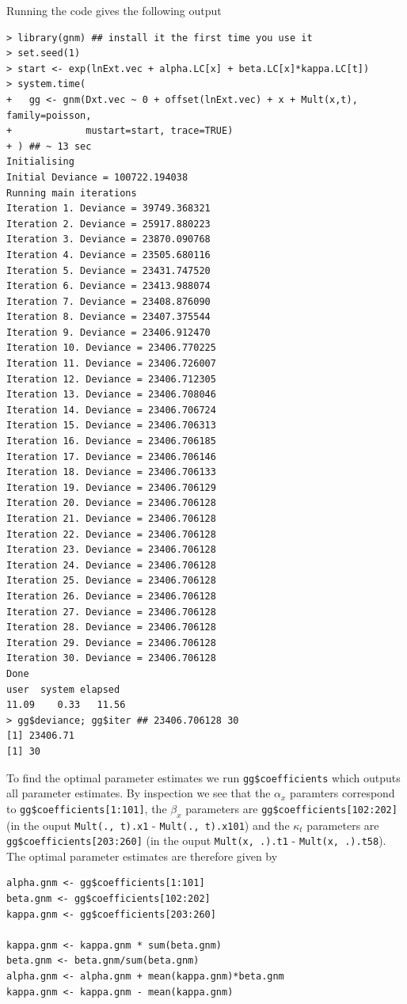 \documentclass[11pt]{article}
\begin{document}
Running the code gives the following output
\begin{verbatim}
> library(gnm) ## install it the first time you use it
> set.seed(1)
> start <- exp(lnExt.vec + alpha.LC[x] + beta.LC[x]*kappa.LC[t])
> system.time(
+   gg <- gnm(Dxt.vec ~ 0 + offset(lnExt.vec) + x + Mult(x,t), family=poisson,
+             mustart=start, trace=TRUE)
+ ) ## ~ 13 sec
Initialising
Initial Deviance = 100722.194038
Running main iterations
Iteration 1. Deviance = 39749.368321
Iteration 2. Deviance = 25917.880223
Iteration 3. Deviance = 23870.090768
Iteration 4. Deviance = 23505.680116
Iteration 5. Deviance = 23431.747520
Iteration 6. Deviance = 23413.988074
Iteration 7. Deviance = 23408.876090
Iteration 8. Deviance = 23407.375544
Iteration 9. Deviance = 23406.912470
Iteration 10. Deviance = 23406.770225
Iteration 11. Deviance = 23406.726007
Iteration 12. Deviance = 23406.712305
Iteration 13. Deviance = 23406.708046
Iteration 14. Deviance = 23406.706724
Iteration 15. Deviance = 23406.706313
Iteration 16. Deviance = 23406.706185
Iteration 17. Deviance = 23406.706146
Iteration 18. Deviance = 23406.706133
Iteration 19. Deviance = 23406.706129
Iteration 20. Deviance = 23406.706128
Iteration 21. Deviance = 23406.706128
Iteration 22. Deviance = 23406.706128
Iteration 23. Deviance = 23406.706128
Iteration 24. Deviance = 23406.706128
Iteration 25. Deviance = 23406.706128
Iteration 26. Deviance = 23406.706128
Iteration 27. Deviance = 23406.706128
Iteration 28. Deviance = 23406.706128
Iteration 29. Deviance = 23406.706128
Iteration 30. Deviance = 23406.706128
Done
user  system elapsed 
11.09    0.33   11.56 
> gg$deviance; gg$iter ## 23406.706128 30
[1] 23406.71
[1] 30
\end{verbatim}

To find the optimal parameter estimates we run \verb|gg$coefficients| which outputs all parameter estimates. By inspection we see that the $\alpha_x$ paramters correspond to \verb|gg$coefficients[1:101]|, the $\beta_x$ parameters are \verb|gg$coefficients[102:202]| (in the ouput \verb|Mult(., t).x1| - \verb|Mult(., t).x101|) and the $\kappa_t$ parameters are \verb|gg$coefficients[203:260]| (in the ouput \verb|Mult(x, .).t1| - \verb|Mult(x, .).t58|). The optimal parameter estimates are therefore given by 
\begin{verbatim}
alpha.gnm <- gg$coefficients[1:101]
beta.gnm <- gg$coefficients[102:202]
kappa.gnm <- gg$coefficients[203:260]

kappa.gnm <- kappa.gnm * sum(beta.gnm)
beta.gnm <- beta.gnm/sum(beta.gnm)
alpha.gnm <- alpha.gnm + mean(kappa.gnm)*beta.gnm
kappa.gnm <- kappa.gnm - mean(kappa.gnm)
\end{verbatim}
\end{document}
